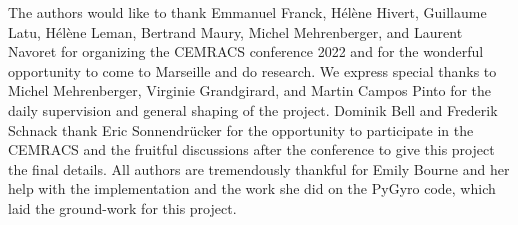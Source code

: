 \documentclass[proc]{edpsmath}
\begin{document}
\maketitle

\tableofcontents %
 \newpage 


 \newpage 
 

 \newpage 
 

 \newpage 
 

 \newpage 


\begin{acknowledgement}
	The authors would like to thank Emmanuel Franck, Hélène Hivert, Guillaume Latu, Hélène Leman, Bertrand Maury, Michel Mehrenberger, and Laurent Navoret for organizing the CEMRACS conference 2022 and for the wonderful opportunity to come to Marseille and do research. We express special thanks to Michel Mehrenberger, Virginie Grandgirard, and Martin Campos Pinto for the daily supervision and general shaping of the project. Dominik Bell and Frederik Schnack thank Eric Sonnendrücker for the opportunity to participate in the CEMRACS and the fruitful discussions after the conference to give this project the final details. All authors are tremendously thankful for Emily Bourne and her help with the implementation and the work she did on the PyGyro code, which laid the ground-work for this project.
\end{acknowledgement}



\end{document}
